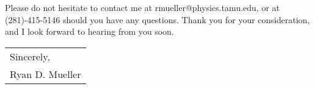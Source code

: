 \documentclass[11pt]{article}
\begin{document}



 Please do not hesitate to contact me at rmueller@physics.tamu.edu, or at (281)-415-5146 should you have any questions. Thank you for your consideration, and I look forward to hearing from you soon.


\bigskip

\begin{tabular}{@{}l@{}}
Sincerely, \\
  [.4em]
  Ryan D. Mueller
\end{tabular}
\end{document}
